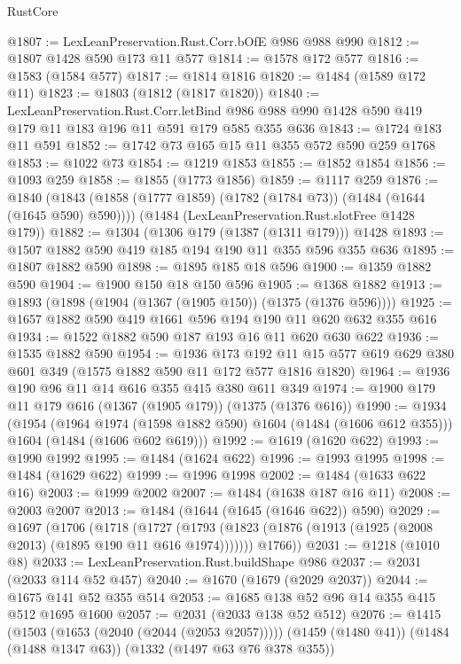 \begin{lexlean}{RustCore}
\begin{coremodule}
@1807 := LexLeanPreservation.Rust.Corr.bOfE @986 @988 @990
@1812 := @1807 @1428 @590 @173 @11 @577
@1814 := @1578 @172 @577
@1816 := @1583 (@1584 @577)
@1817 := @1814 @1816
@1820 := @1484 (@1589 @172 @11)
@1823 := @1803 (@1812 (@1817 @1820))
@1840 := LexLeanPreservation.Rust.Corr.letBind
    @986
    @988
    @990
    @1428
    @590
    @419
    @179
    @11
    @183
    @196
    @11
    @591
    @179
    @585
    @355
    @636
@1843 := @1724 @183 @11 @591
@1852 := @1742 @73 @165 @15 @11 @355 @572 @590 @259 @1768
@1853 := @1022 @73
@1854 := @1219 @1853
@1855 := @1852 @1854
@1856 := @1093 @259
@1858 := @1855 (@1773 @1856)
@1859 := @1117 @259
@1876 := @1840
    (@1843 (@1858 (@1777 @1859) (@1782 (@1784 @73)) (@1484 (@1644 (@1645 @590) @590))))
    (@1484 (LexLeanPreservation.Rust.slotFree @1428 @179))
@1882 := @1304 (@1306 @179 (@1387 (@1311 @179))) @1428
@1893 := @1507 @1882 @590 @419 @185 @194 @190 @11 @355 @596 @355 @636
@1895 := @1807 @1882 @590
@1898 := @1895 @185 @18 @596
@1900 := @1359 @1882 @590
@1904 := @1900 @150 @18 @150 @596
@1905 := @1368 @1882
@1913 := @1893 (@1898 (@1904 (@1367 (@1905 @150)) (@1375 (@1376 @596))))
@1925 := @1657 @1882 @590 @419 @1661 @596 @194 @190 @11 @620 @632 @355 @616
@1934 := @1522 @1882 @590 @187 @193 @16 @11 @620 @630 @622
@1936 := @1535 @1882 @590
@1954 := @1936
    @173
    @192
    @11
    @15
    @577
    @619
    @629
    @380
    @601
    @349
    (@1575 @1882 @590 @11 @172 @577 @1816 @1820)
@1964 := @1936 @190 @96 @11 @14 @616 @355 @415 @380 @611 @349
@1974 := @1900 @179 @11 @179 @616 (@1367 (@1905 @179)) (@1375 (@1376 @616))
@1990 := @1934
    (@1954
      (@1964 @1974 (@1598 @1882 @590) @1604 (@1484 (@1606 @612 @355)))
      @1604
      (@1484 (@1606 @602 @619)))
@1992 := @1619 (@1620 @622)
@1993 := @1990 @1992
@1995 := @1484 (@1624 @622)
@1996 := @1993 @1995
@1998 := @1484 (@1629 @622)
@1999 := @1996 @1998
@2002 := @1484 (@1633 @622 @16)
@2003 := @1999 @2002
@2007 := @1484 (@1638 @187 @16 @11)
@2008 := @2003 @2007
@2013 := @1484 (@1644 (@1645 (@1646 @622)) @590)
@2029 := @1697
    (@1706
      (@1718
        (@1727 (@1793 (@1823 (@1876 (@1913 (@1925 (@2008 @2013) (@1895 @190 @11 @616 @1974)))))))
        @1766))
@2031 := @1218 (@1010 @8)
@2033 := LexLeanPreservation.Rust.buildShape @986
@2037 := @2031 (@2033 @114 @52 @457)
@2040 := @1670 (@1679 (@2029 @2037))
@2044 := @1675 @141 @52 @355 @514
@2053 := @1685 @138 @52 @96 @14 @355 @415 @512 @1695 @1600
@2057 := @2031 (@2033 @138 @52 @512)
@2076 := @1415
    (@1503 (@1653 (@2040 (@2044 (@2053 @2057)))))
    (@1459 (@1480 @41))
    (@1484 (@1488 @1347 @63))
    (@1332 (@1497 @63 @76 @378 @355))

\end{coremodule}
\end{lexlean}
